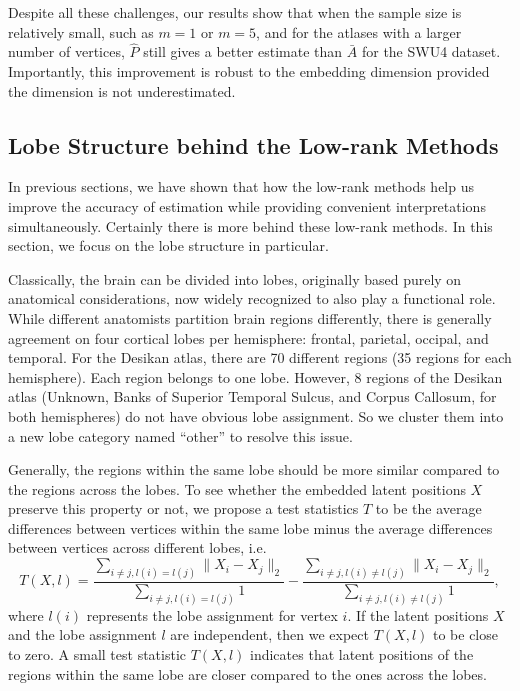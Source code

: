 Despite all these challenges, our results show that when the sample size is relatively small, such as $m=1$ or $m=5$, and for the atlases with a larger number of vertices, $\hat{P}$ still gives a better estimate than $\bar{A}$ for the SWU4 dataset.
Importantly, this improvement is robust to the embedding dimension provided the dimension is not underestimated.



\subsection{Lobe Structure behind the Low-rank Methods}
\label{section:lobe_structure}
In previous sections, we have shown that how the low-rank methods help us improve the accuracy of estimation while providing convenient interpretations simultaneously. Certainly there is more behind these low-rank methods. In this section, we focus on the lobe structure in particular.

Classically, the brain can be divided into lobes, originally based purely on anatomical considerations, now widely recognized to also play a functional role.  While different anatomists partition brain regions differently, there is generally agreement on four cortical lobes per hemisphere: frontal, parietal, occipal, and temporal.
For the Desikan atlas, there are 70 different regions (35 regions for each hemisphere). Each region belongs to one lobe. However, 8 regions of the Desikan atlas (Unknown, Banks of Superior Temporal Sulcus, and Corpus Callosum, for both hemispheres) do not have obvious lobe assignment. So we cluster them into a new lobe category named ``other'' to resolve this issue.

Generally, the regions within the same lobe should be more similar compared to the regions across the lobes. To see whether the embedded latent positions $X$ preserve this property or not, we propose a test statistics $T$ to be the average differences between vertices within the same lobe minus the average differences between vertices across different lobes, i.e.
\[
T(X, l) = \frac{\sum_{i \ne j, l(i) = l(j)} \|X_i - X_j \|_2}{\sum_{i \ne j, l(i) = l(j)} 1} -
\frac{\sum_{i \ne j, l(i) \ne l(j)} \|X_i - X_j \|_2}{\sum_{i \ne j, l(i) \ne l(j)} 1},
\]
where $l(i)$ represents the lobe assignment for vertex $i$. If the latent positions $X$ and the lobe assignment $l$ are independent, then we expect $T(X, l)$ to be close to zero. A small test statistic $T(X, l)$ indicates that latent positions of the regions within the same lobe are closer compared to the ones across the lobes.

